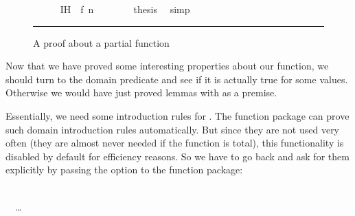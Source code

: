 \begin{isabellebody}
\begin{figure}
\begin{minipage}{0.8\textwidth}
\ \ \ \ \isamarkupfalse%
\ IH\ \ {}f\ n\ {}\ {}{}\isanewline
\ \ \ \ \isamarkupfalse%
\ {}thesis\ \isamarkupfalse%
\ simp\isanewline
\ \ \isamarkupfalse%
\isanewline
{}\isamarkupfalse%
%
\endisatagproof
{\isafoldproof}%
%
\isadelimproof
%
\endisadelimproof
%
\isamarkupfalse{}
\end{minipage}\vspace{6pt}\hrule
\caption{A proof about a partial function}\label{findzero_isar}
\end{figure}
%
\isamarkuptrue%
%
\begin{isamarkuptext}%
Now that we have proved some interesting properties about our
  function, we should turn to the domain predicate and see if it is
  actually true for some values. Otherwise we would have just proved
  lemmas with  as a premise.

  Essentially, we need some introduction rules for . The function package can prove such domain
  introduction rules automatically. But since they are not used very
  often (they are almost never needed if the function is total), this
  functionality is disabled by default for efficiency reasons. So we have to go
  back and ask for them explicitly by passing the  option to the function package:

\vspace{1ex}
\noindent{} \\%
\isanewline%
\ \ \ldots\\


\end{isamarkuptext}
\end{isabellebody}
